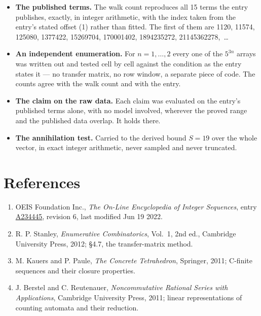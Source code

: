 \documentclass[11pt]{article}
\theoremstyle{definition}
\begin{document}
\begin{itemize}

\item {\bfseries The published terms.} The walk count reproduces all 15 terms the entry publishes, exactly, in integer arithmetic, with the index taken from the entry's stated offset (1) rather than fitted. The first of them are 1120, 11574, 125080, 1377422, 15269704, 170001402, 1894235272, 21145362278,~\dots

\item {\bfseries An independent enumeration.} For $n = 1,\dots,2$ every one of the $5^{3n}$ arrays was written out and tested cell by cell against the condition as the entry states it --- no transfer matrix, no row window, a separate piece of code. The counts agree with the walk count and with the entry.

\item {\bfseries The claim on the raw data.} Each claim was evaluated on the entry's published terms alone, with no model involved, wherever the proved range and the published data overlap. It holds there.

\item {\bfseries The annihilation test.} Carried to the derived bound $S = 19$ over the whole vector, in exact integer arithmetic, never sampled and never truncated.

\end{itemize}

\section{References}

\begin{enumerate}

\item OEIS Foundation Inc., \emph{The On-Line Encyclopedia of Integer Sequences}, entry \href{https://oeis.org/A234445}{A234445}, revision 6, last modified Jun 19 2022.

\item R. P. Stanley, \emph{Enumerative Combinatorics}, Vol.~1, 2nd ed., Cambridge University Press, 2012; \S4.7, the transfer-matrix method.

\item M. Kauers and P. Paule, \emph{The Concrete Tetrahedron}, Springer, 2011; C-finite sequences and their closure properties.

\item J. Berstel and C. Reutenauer, \emph{Noncommutative Rational Series with Applications}, Cambridge University Press, 2011; linear representations of counting automata and their reduction.

\end{enumerate}
\end{document}
